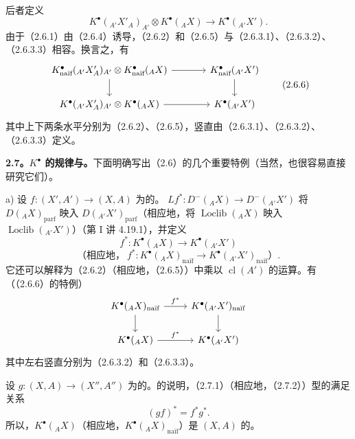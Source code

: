 后者定义
\[K^\bullet({}_{A'}X'_A)_{A'}\otimes K^\bullet({}_AX)\longrightarrow K^\bullet({}_{A'}X').\tag{2.6.5}\]
由于（2.6.1）由（2.6.4）诱导，（2.6.2）和（2.6.5）与（2.6.3.1）、（2.6.3.2）、（2.6.3.3）相容。换言之，有
\[
\begin{tikzcd}[column sep=large]
K^\bullet_{\text{naïf}}({}_{A'}X'_A)_{A'}\otimes K^\bullet_{\text{naïf}}({}_AX)\arrow[r]\arrow[d]&K^\bullet_{\text{naïf}}({}_{A'}X')\arrow[d]\\
K^\bullet({}_{A'}X'_A)_{A'}\otimes K^\bullet({}_AX)\arrow[r]&K^\bullet({}_{A'}X')
\end{tikzcd}\tag{2.6.6}
\]
其中上下两条水平分别为（2.6.2）、（2.6.5），竖直由（2.6.3.1）、（2.6.3.2）、（2.6.3.3）定义。

\textbf{2.7。$K^\bullet$ 的规律与。}下面明确写出（2.6）的几个重要特例（当然，也很容易直接研究它们）。

a) 设 $f:(X',A')\to(X,A)$ 为的。 $Lf^*:D^-({}_AX)\to D^-({}_{A'}X')$ 将 $D({}_AX)_{\mathrm{parf}}$ 映入 $D({}_{A'}X')_{\mathrm{parf}}$（相应地，将 $\operatorname{Loclib}({}_AX)$ 映入 $\operatorname{Loclib}({}_{A'}X')$）（第 I 讲 4.19.1），并定义
\[f^*:K^\bullet({}_AX)\longrightarrow K^\bullet({}_{A'}X')\tag{2.7.1}\]
\[\text{（相应地，}\ f^*:K^\bullet({}_AX)_{\text{naïf}}\longrightarrow K^\bullet({}_{A'}X')_{\text{naïf}}\text{）}.\tag{2.7.2}\]
它还可以解释为（2.6.2）（相应地，（2.6.5））中乘以 $\operatorname{cl}(A')$ 的运算。有（（2.6.6）的特例）
\[\begin{tikzcd}
K^\bullet({}_AX)_{\text{naïf}}\arrow[r,"f^*"]\arrow[d]&K^\bullet({}_{A'}X')_{\text{naïf}}\arrow[d]\\
K^\bullet({}_AX)\arrow[r,"f^*"]&K^\bullet({}_{A'}X')
\end{tikzcd}\]
其中左右竖直分别为（2.6.3.2）和（2.6.3.3）。

设 $g:(X,A)\to(X'',A'')$ 为的。的说明，（2.7.1）（相应地，（2.7.2））型的满足关系
\[(gf)^*=f^*g^*.\tag{2.7.3}\]
所以，$K^\bullet({}_AX)$（相应地，$K^\bullet({}_AX)_{\text{naïf}}$）是 $(X,A)$ 的。

